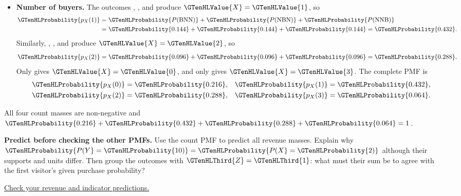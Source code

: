 \begin{itemize}
	\item \textbf{Number of buyers.}
	The outcomes , , and  produce $\GTenHLValue{X}=\GTenHLValue{1}$, so
	\[
	\begin{aligned}
		\GTenHLProbability{p_{X}(1)}
		&=\GTenHLProbability{P(\mathrm{BNN})}+\GTenHLProbability{P(\mathrm{NBN})}+\GTenHLProbability{P(\mathrm{NNB})}\\
		&=\GTenHLProbability{0.144}+\GTenHLProbability{0.144}+\GTenHLProbability{0.144}=\GTenHLProbability{0.432}.
	\end{aligned}
	\]
	Similarly, , , and  produce $\GTenHLValue{X}=\GTenHLValue{2}$, so
	\[
	\GTenHLProbability{p_{X}(2)}=\GTenHLProbability{0.096}+\GTenHLProbability{0.096}+\GTenHLProbability{0.096}=\GTenHLProbability{0.288}.
	\]
	Only  gives $\GTenHLValue{X}=\GTenHLValue{0}$, and only  gives $\GTenHLValue{X}=\GTenHLValue{3}$.
	The complete PMF is
	\[
	\begin{aligned}
		\GTenHLProbability{p_{X}(0)}&=\GTenHLProbability{0.216}, & \GTenHLProbability{p_{X}(1)}&=\GTenHLProbability{0.432},\\
		\GTenHLProbability{p_{X}(2)}&=\GTenHLProbability{0.288}, & \GTenHLProbability{p_{X}(3)}&=\GTenHLProbability{0.064}.
	\end{aligned}
	\]

	\end{itemize}
All four count masses are non-negative and $\GTenHLProbability{0.216}+\GTenHLProbability{0.432}+\GTenHLProbability{0.288}+\GTenHLProbability{0.064}=1$.

\textbf{Predict before checking the other PMFs.} Use the count PMF to predict all revenue masses. Explain why $\GTenHLProbability{P(Y}=\GTenHLProbability{10)}=\GTenHLProbability{P(X}=\GTenHLProbability{2)}$ although their supports and units differ. Then group the outcomes with $\GTenHLThird{Z}=\GTenHLThird{1}$: what must their sum be to agree with the first visitor's given purchase probability?

\par\smallskip\noindent\hyperref[check:sale-comparisons]{Check your revenue and indicator predictions.}
